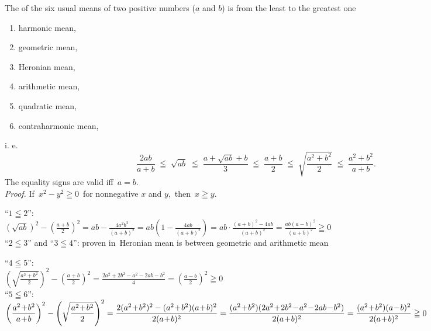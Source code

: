 \documentclass[12pt]{article}
\theoremstyle{definition}
\begin{document}
The  of the six usual means of two positive numbers ($a$ and $b$) is from the least to the greatest one
\begin{enumerate}
\item harmonic mean,
\item geometric mean,
\item Heronian mean,
\item arithmetic mean,
\item quadratic mean,
\item contraharmonic mean,
\end{enumerate}
i. e. 
$$\frac{2ab}{a\!+\!b} \;\leqq\; \sqrt{ab} \;\leqq\; \frac{a\!+\!\sqrt{ab}\!+\!b}{3} \;\leqq\; \frac{a\!+\!b}{2} 
\;\leqq\; \sqrt{\frac{a^2\!+\!b^2}{2}} \;\leqq\; \frac{a^2\!+\!b^2}{a\!+\!b}.$$
The equality signs are valid iff \,$a = b$.\\

{\em Proof.}\; If\, $x^2-y^2 \geqq 0$\, for nonnegative $x$ and $y$,\, then\, $x \geqq y$.

``$1\leqq2$'':\\
$\displaystyle\left(\sqrt{ab}\right)^2-\left(\frac{a\!+\!b}{2}\right)^2 = ab\!-\!\frac{4a^2b^2}{(a\!+\!b)^2} 
= ab\left(1\!-\!\frac{4ab}{(a\!+\!b)^2}\right) = ab\cdot\frac{(a\!+\!b)^2-4ab}{(a\!+\!b)^2} 
= \frac{ab(a\!-\!b)^2}{(a+b)^2} \geqq 0$\\

``$2\leqq3$'' and ``$3\leqq4$'': proven in\, Heronian mean is between geometric and arithmetic mean

``$4\leqq5$'':\\
$\displaystyle\left(\sqrt{\frac{a^2\!+\!b^2}{2}}\right)^2-\left(\frac{a\!+\!b}{2}\right)^2 
= \frac{2a^2\!+\!2b^2\!-\!a^2\!-\!2ab\!-\!b^2}{4} = \left(\frac{a\!-\!b}{2}\right)^2 \geqq 0$\\

``$5\leqq6$'':\\
$\displaystyle\left(\frac{a^2\!+\!b^2}{a\!+\!b}\right)^2-\left(\sqrt{\frac{a^2\!+\!b^2}{2}}\right)^2 
= \frac{2(a^2\!+\!b^2)^2-(a^2\!+\!b^2)(a\!+\!b)^2}{2(a\!+\!b)^2} = 
\frac{(a^2\!+\!b^2)(2a^2\!+\!2b^2\!-\!a^2\!-\!2ab\!-\!b^2)}{2(a\!+\!b)^2}\\ 
= \frac{(a^2\!+\!b^2)(a\!-\!b)^2}{2(a\!+\!b)^2} \geqq 0$
\end{document}
